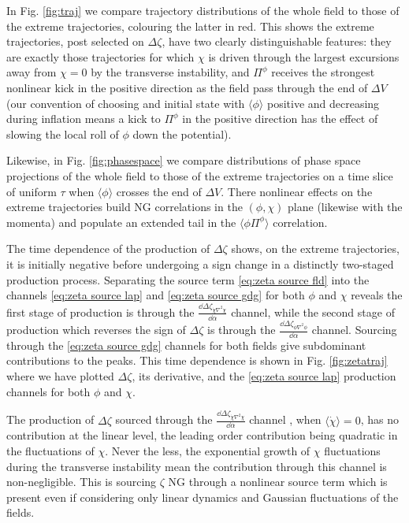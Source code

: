In Fig. \ref{fig:traj} we compare trajectory distributions of the whole field to those of the extreme trajectories, colouring the latter in red. This shows the extreme trajectories, post selected on $\Delta\zeta$, have two clearly distinguishable features: they are exactly those trajectories for which $\chi$ is driven through the largest excursions away from $\chi=0$ by the transverse instability, and $\Pi^\phi$ receives the strongest nonlinear kick in the positive direction as the field pass through the end of $\Delta V$ (our convention of choosing and initial state with $\langle\phi\rangle$ positive and decreasing during inflation means a kick to $\Pi^\phi$ in the positive direction has the effect of slowing the local roll of $\phi$ down the potential).

Likewise, in Fig. \ref{fig:phasespace} we compare distributions of phase space projections of the whole field to those of the extreme trajectories on a time slice of uniform $\tau$ when $\langle\phi\rangle$ crosses the end of $\Delta V$. There nonlinear effects on the extreme trajectories build NG correlations in the $(\phi,\chi)$ plane (likewise with the momenta) and populate an extended tail in the $\langle\phi\Pi^\phi\rangle$ correlation.


The time dependence of the production of $\Delta\zeta$ shows, on the extreme trajectories, it is initially negative before undergoing a sign change in a distinctly two-staged production process. Separating the source term \eqref{eq:zeta source fld} into the channels \eqref{eq:zeta source lap} and \eqref{eq:zeta source gdg} for both $\phi$ and $\chi$ reveals the first stage of production is through the
$\frac{\dd\Delta\zeta_{\dot{\chi}\nabla^2\chi}}{\dd\alpha}$ channel,
while the second stage of production which reverses the sign of $\Delta\zeta$ is through the
$\frac{\dd\Delta\zeta_{\dot{\phi}\nabla^2\phi}}{\dd\alpha}$ channel.
Sourcing through the \eqref{eq:zeta source gdg} channels for both fields give subdominant contributions to the peaks. This time dependence is shown in Fig. \ref{fig:zetatraj} where we have plotted $\Delta\zeta$, its derivative, and the \eqref{eq:zeta source lap} production channels for both $\phi$ and $\chi$.

\Fzetatraj

The production of $\Delta\zeta$ sourced through the
$\frac{\dd\Delta\zeta_{\dot{\chi}\nabla^2\chi}}{\dd\alpha}$ channel
, when $\langle\dot{\chi}\rangle = 0$, has no contribution at the linear level, the leading order contribution being quadratic in the fluctuations of $\chi$. Never the less, the exponential growth of $\chi$ fluctuations during the transverse instability mean the contribution through this channel is non-negligible.
This is sourcing $\zeta$ NG through a nonlinear source term which is present even if considering only linear dynamics and Gaussian fluctuations of the fields.

